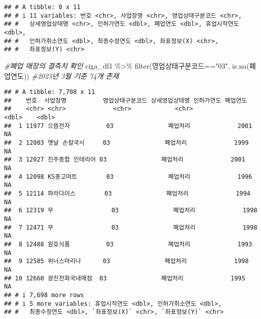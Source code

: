 \documentclass[
]{book}
\newenvironment{Shaded}{\begin{snugshade}}{\end{snugshade}}
\newcommand{\CommentTok}[1]{\textcolor[rgb]{0.56,0.35,0.01}{\textit{#1}}}
\newcommand{\FunctionTok}[1]{\textcolor[rgb]{0.00,0.00,0.00}{#1}}
\newcommand{\NormalTok}[1]{#1}
\newcommand{\OtherTok}[1]{\textcolor[rgb]{0.56,0.35,0.01}{#1}}
\newcommand{\SpecialCharTok}[1]{\textcolor[rgb]{0.00,0.00,0.00}{#1}}
\newcommand{\StringTok}[1]{\textcolor[rgb]{0.31,0.60,0.02}{#1}}
\begin{document}
\begin{verbatim}
## # A tibble: 0 x 11
## # i 11 variables: 번호 <chr>, 사업장명 <chr>, 영업상태구분코드 <chr>,
## #   상세영업상태명 <chr>, 인허가연도 <dbl>, 폐업연도 <dbl>, 휴업시작연도 <dbl>,
## #   인허가취소연도 <dbl>, 최종수정연도 <dbl>, 좌표정보(X) <chr>,
## #   좌표정보(Y) <chr>
\end{verbatim}

\begin{Shaded}
\begin{Highlighting}[]
\CommentTok{\#폐업 매장의 결측치 확인}
\NormalTok{ciga\_df1 }\SpecialCharTok{\%\textgreater{}\%}
  \FunctionTok{filter}\NormalTok{(영업상태구분코드}\SpecialCharTok{==}\StringTok{"03"}\NormalTok{, }\FunctionTok{is.na}\NormalTok{(폐업연도)) }\CommentTok{\#2023년 3월 기준 74개 존재}
\end{Highlighting}
\end{Shaded}

\begin{verbatim}
## # A tibble: 7,708 x 11
##    번호  사업장명          영업상태구분코드 상세영업상태명 인허가연도 폐업연도
##    <chr> <chr>             <chr>            <chr>               <dbl>    <dbl>
##  1 11977 으뜸전자          03               폐업처리             2001       NA
##  2 12003 옛날 손칼국시     03               폐업처리             1999       NA
##  3 12027 진주종합 인테리어 03               폐업처리             2001       NA
##  4 12098 KS중고마트        03               폐업처리             1996       NA
##  5 12114 파라다이스        03               폐업처리             1994       NA
##  6 12319 무                03               폐업처리             1998       NA
##  7 12471 무                03               폐업처리             1998       NA
##  8 12488 원호식품          03               폐업처리             1993       NA
##  9 12585 위너스마리나      03               폐업처리             1998       NA
## 10 12660 광진전화국내매점  03               폐업처리             1995       NA
## # i 7,698 more rows
## # i 5 more variables: 휴업시작연도 <dbl>, 인허가취소연도 <dbl>,
## #   최종수정연도 <dbl>, `좌표정보(X)` <chr>, `좌표정보(Y)` <chr>
\end{verbatim}

\begin{Shaded}
\end{Shaded}
\end{document}
